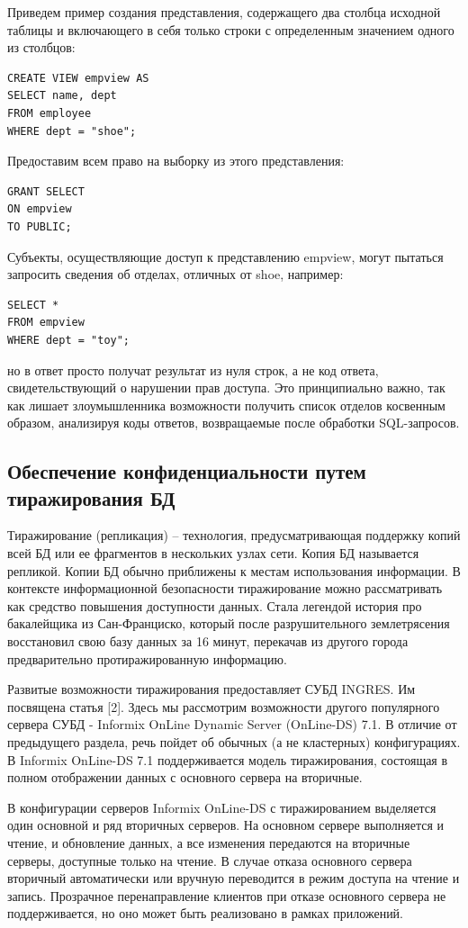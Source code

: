 Приведем пример создания представления, содержащего два столбца исходной таблицы и включающего в себя только строки с определенным значением одного из столбцов:
\begin{lstlisting}[]
CREATE VIEW empview AS
SELECT name, dept
FROM employee
WHERE dept = "shoe";
\end{lstlisting}
Предоставим всем право на выборку из этого представления:
\begin{lstlisting}[]
GRANT SELECT
ON empview
TO PUBLIC;
\end{lstlisting}
Субъекты, осуществляющие доступ к представлению empview, могут пытаться запросить сведения об отделах, отличных от shoe, например:
\begin{lstlisting}[]
SELECT *
FROM empview
WHERE dept = "toy";
\end{lstlisting}
но в ответ просто получат результат из нуля строк, а не код ответа, свидетельствующий о нарушении прав доступа. Это принципиально важно, так как лишает злоумышленника возможности получить список отделов косвенным образом, анализируя коды ответов, возвращаемые после обработки SQL-запросов.
\subsection{Обеспечение конфиденциальности путем тиражирования БД}

Тиражирование (репликация) – технология, предусматривающая поддержку
копий всей БД или ее фрагментов в нескольких узлах сети. Копия БД называется
репликой. Копии БД обычно приближены к местам использования информации.
В контексте информационной безопасности тиражирование можно рассматривать как средство повышения доступности данных. Стала легендой история про бакалейщика из Сан-Франциско, который после разрушительного землетрясения восстановил свою базу данных за 16 минут, перекачав из другого города предварительно протиражированную информацию.

Развитые возможности тиражирования предоставляет СУБД INGRES. Им посвящена статья [2]. Здесь мы рассмотрим возможности другого популярного сервера СУБД - Informix OnLine Dynamic Server (OnLine-DS) 7.1. В отличие от предыдущего раздела, речь пойдет об обычных (а не кластерных) конфигурациях.
В Informix OnLine-DS 7.1 поддерживается модель тиражирования, состоящая в полном отображении данных с основного сервера на вторичные.

В конфигурации серверов Informix OnLine-DS с тиражированием выделяется один основной и ряд вторичных серверов. На основном сервере выполняется и чтение, и обновление данных, а все изменения передаются на вторичные серверы, доступные только на чтение. В случае отказа основного сервера вторичный автоматически или вручную переводится в режим доступа на чтение и запись. Прозрачное перенаправление клиентов при отказе основного сервера не поддерживается, но оно может быть реализовано в рамках приложений.

